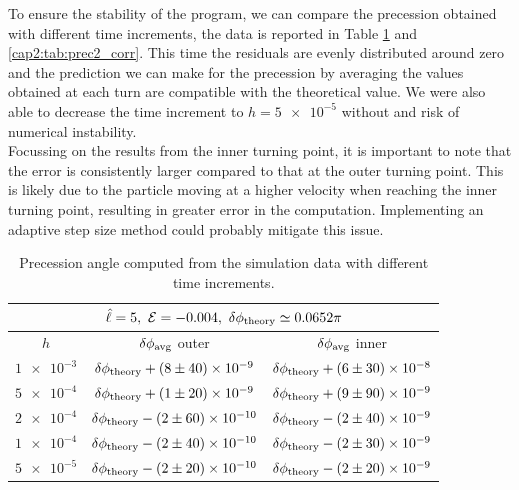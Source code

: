 To ensure the stability of the program, we can compare the precession obtained
with different time increments, the data is reported in Table
\ref{cap2:tab:prec1_corr} and \ref{cap2:tab:prec2_corr}.
This time the residuals are evenly distributed around zero and the prediction we
can make for the precession by averaging the values obtained at each turn are
compatible with the theoretical value.
We were also able to decrease the time increment to $h = \num{5e-5}$ without
and risk of numerical instability. \\
Focussing on the results from the inner turning point, it is important to note
that the error is consistently larger compared to that at the outer turning
point.
This is likely due to the particle moving at a higher velocity when reaching the
inner turning point, resulting in greater error in the computation.
Implementing an adaptive step size method could probably mitigate this issue.

\begin{table}[h]
    \centering
    \begin{tabular}{|c|c|c|}
        \hline
        \multicolumn{3}{|c|}{$\hat \ell = 5, ~ \mathcal E = -0.004,
        ~ \delta \phi_{\rm theory} \simeq 0.0652 \pi$} \\
        \hline
        $h$ & $\delta \phi_{\rm avg}$ outer & $\delta \phi_{\rm avg}$ inner \\
        \hline
        $\num{1e-3}$ & $\delta \phi_{\rm theory} + (8 \pm 40) \times \num{e-9}$
        & $\delta \phi_{\rm theory} + (6 \pm 30) \times \num{e-8}$ \\
        \hline
        $\num{5e-4}$ & $\delta \phi_{\rm theory} + (1 \pm 20) \times \num{e-9}$
        & $\delta \phi_{\rm theory} + (9 \pm 90) \times \num{e-9}$ \\
        \hline
        $\num{2e-4}$ & $\delta \phi_{\rm theory} - (2 \pm 60) \times \num{e-10}$
        & $\delta \phi_{\rm theory} - (2 \pm 40) \times \num{e-9}$ \\
        \hline
        $\num{1e-4}$ & $\delta \phi_{\rm theory} - (2 \pm 40) \times \num{e-10}$
        & $\delta \phi_{\rm theory} - (2 \pm 30) \times \num{e-9}$ \\
        \hline
        $\num{5e-5}$ & $\delta \phi_{\rm theory} - (2 \pm 20) \times \num{e-10}$
        & $\delta \phi_{\rm theory} - (2 \pm 20) \times \num{e-9}$ \\
        \hline
    \end{tabular}
    \caption{Precession angle computed from the simulation data with different
    time increments.}
    \label{cap2:tab:prec1_corr}
\end{table}

